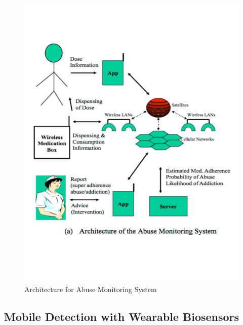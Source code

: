 \documentclass[sigconf]{acmart}
\begin{document}
\begin{figure}[!ht]
  \centering\includegraphics[width=\columnwidth]{images/Figure3.pdf}
  \caption{Architecture for Abuse Monitoring System \cite{Varshney14}
  }\label{f:Figure3}
\end{figure}

\subsection{Mobile Detection with Wearable Biosensors}
\end{document}
